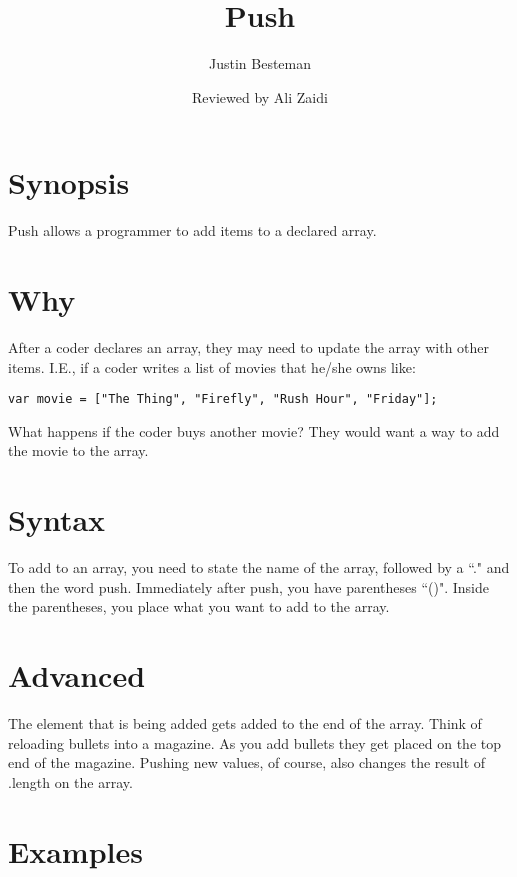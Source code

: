 \documentclass[12pt, letterpaper]{article}
\title{Push}
\author{Justin Besteman}
\date{Reviewed by Ali Zaidi}
\begin{document}
\maketitle

\section*{Synopsis}

Push allows a programmer to add items to a declared array.

\section*{Why}

After a coder declares an array, they may need to update the array with other items. I.E., if a coder writes a list of movies that he/she owns like: 
\begin{lstlisting}
var movie = ["The Thing", "Firefly", "Rush Hour", "Friday"];
\end{lstlisting}
What happens if the coder buys another movie? They would want a way to add the movie to the array.
\section*{Syntax}
To add to an array, you need to state the name of the array, followed by a ``." and then the word push. Immediately after push, you have parentheses ``()". Inside the parentheses, you place what you want to add to the array.
\section*{Advanced}

The element that is being added gets added to the end of the array. Think of reloading bullets into a magazine. As you add bullets they get placed on the top end of the magazine. Pushing new values, of course, also changes the result of .length on the array. 

\section*{Examples}
\end{document}
